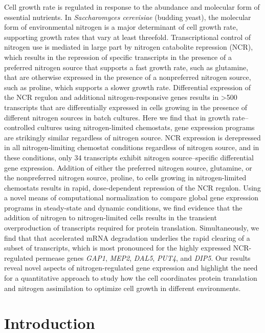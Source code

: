 Cell growth rate is
regulated in response to the abundance and molecular form of essential
nutrients. In \textit{Saccharomyces cerevisiae} (budding yeast), the molecular
form of environmental nitrogen is a major determinant of cell growth
rate, supporting growth rates that vary at least threefold.
Transcriptional control of nitrogen use is mediated in large part by
nitrogen catabolite repression (NCR), which results in the repression
of specific transcripts in the presence of a preferred nitrogen source
that supports a fast growth rate, such as glutamine, that are
otherwise expressed in the presence of a nonpreferred nitrogen source,
such as proline, which supports a slower growth rate. Differential
expression of the NCR regulon and additional nitrogen-responsive genes
results in >500 transcripts that are differentially expressed in cells
growing in the presence of different nitrogen sources in batch
cultures. Here we find that in growth rate–controlled cultures using
nitrogen-limited chemostats, gene expression programs are strikingly
similar regardless of nitrogen source. NCR expression is derepressed
in all nitrogen-limiting chemostat conditions regardless of nitrogen
source, and in these conditions, only 34 transcripts exhibit nitrogen
source–specific differential gene expression. Addition of either the
preferred nitrogen source, glutamine, or the nonpreferred nitrogen
source, proline, to cells growing in nitrogen-limited chemostats
results in rapid, dose-dependent repression of the NCR regulon. Using
a novel means of computational normalization to compare global gene
expression programs in steady-state and dynamic conditions, we find
evidence that the addition of nitrogen to nitrogen-limited cells
results in the transient overproduction of transcripts required for
protein translation. Simultaneously, we find that that accelerated
mRNA degradation underlies the rapid clearing of a subset of
transcripts, which is most pronounced for the highly expressed
NCR-regulated permease genes \textit{GAP1}, \textit{MEP2}, 
\textit{DAL5}, \textit{PUT4}, and \textit{DIP5}. Our
results reveal novel aspects of nitrogen-regulated gene expression and
highlight the need for a quantitative approach to study how the cell
coordinates protein translation and nitrogen assimilation to optimize
cell growth in different environments.  

\section{Introduction}

